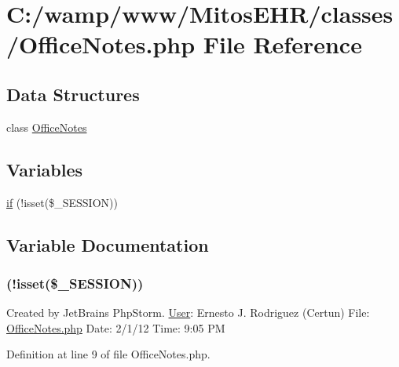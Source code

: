\hypertarget{_office_notes_8php}{\section{\-C\-:/wamp/www/\-Mitos\-E\-H\-R/classes/\-Office\-Notes.php \-File \-Reference}
\label{_office_notes_8php}
}
\subsection*{\-Data \-Structures}
\begin{DoxyCompactItemize}
\item 
class \hyperlink{class_office_notes}{\-Office\-Notes}
\end{DoxyCompactItemize}
\subsection*{\-Variables}
\begin{DoxyCompactItemize}
\item 
\hyperlink{_office_notes_8php_a8ceca98aa29914fd2479a84a8d2242fb}{if} (!isset(\$\-\_\-\-S\-E\-S\-S\-I\-O\-N))
\end{DoxyCompactItemize}


\subsection{\-Variable \-Documentation}
\hypertarget{_office_notes_8php_a8ceca98aa29914fd2479a84a8d2242fb}{
\subsubsection[{if}]{(!isset(\$\-\_\-\-S\-E\-S\-S\-I\-O\-N))}}\label{_office_notes_8php_a8ceca98aa29914fd2479a84a8d2242fb}
\-Created by \-Jet\-Brains \-Php\-Storm. \hyperlink{class_user}{\-User}\-: \-Ernesto \-J. \-Rodriguez (\-Certun) \-File\-: \hyperlink{_office_notes_8php}{\-Office\-Notes.\-php} \-Date\-: 2/1/12 \-Time\-: 9\-:05 \-P\-M 

\-Definition at line 9 of file \-Office\-Notes.\-php.


